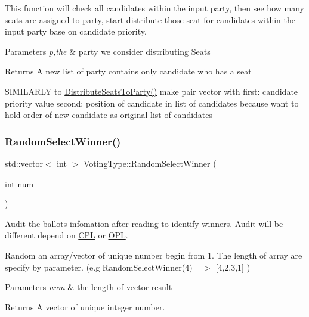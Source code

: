 This function will check all candidates within the input party, then see how many seats are assigned to party, start distribute those seat for candidates within the input party base on candidate priority. 


\begin{DoxyParams}{Parameters}
{\em p,the} & party we consider distributing Seats\\
\hline
\end{DoxyParams}
\begin{DoxyReturn}{Returns}
A new list of party contains only candidate who has a seat 
\end{DoxyReturn}
S\+I\+M\+I\+L\+A\+R\+LY to \hyperlink{classVotingType_a38b581488ff63dde73225360b56161dc}{Distribute\+Seats\+To\+Party()} make pair vector with first\+: candidate priority value second\+: position of candidate in list of candidates because want to hold order of new candidate as original list of candidates\mbox{\label{classVotingType_a60437fc2b77f6142bd055d241600ba77}} 
\subsubsection{\texorpdfstring{Random\+Select\+Winner()}{RandomSelectWinner()}}
{\footnotesize\ttfamily std\+::vector$<$ int $>$ Voting\+Type\+::\+Random\+Select\+Winner (\begin{DoxyParamCaption}\item[{int}]{num }\end{DoxyParamCaption})}



Audit the ballots infomation after reading to identify winners. Audit will be different depend on \hyperlink{classCPL}{C\+PL} or \hyperlink{classOPL}{O\+PL}. 

Random an array/vector of unique number begin from 1. The length of array are specify by parameter. (e.\+g Random\+Select\+Winner(4) =$>$ \mbox{[}4,2,3,1\mbox{]} )


\begin{DoxyParams}{Parameters}
{\em num} & the length of vector result\\
\hline
\end{DoxyParams}
\begin{DoxyReturn}{Returns}
A vector of unique integer number. 
\end{DoxyReturn}
\mbox{\label{classVotingType_aea409923e712452a9efd8be643f30f01}} 
